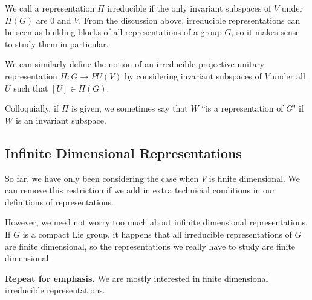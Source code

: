 We call a representation $\Pi$ irreducible if the only invariant subspaces of $V$ under $\Pi(G)$ are 0 and $V$. From the discussion above, irreducible representations can be seen as building blocks of all representations of a group $G$, so it makes sense to study them in particular.

We can similarly define the notion of an irreducible projective unitary representation $\Pi: G \rightarrow PU(V)$ by considering invariant subspaces of $V$ under all $U$ such that $[U] \in \Pi(G)$.

Colloquially, if $\Pi$ is given, we sometimes say that $W$ ``is a representation of $G$" if $W$ is an invariant subspace.

\subsection{Infinite Dimensional Representations}
So far, we have only been considering the case when $V$ is finite dimensional. We can remove this restriction if we add in extra technicial conditions in our definitions of representations.

However, we need not worry too much about infinite dimensional representations. If $G$ is a compact Lie group, it happens that all irreducible representations of $G$ are finite dimensional, so the representations we really have to study are finite dimensional.

\textbf{Repeat for emphasis.} We are mostly interested in finite dimensional irreducible representations.
